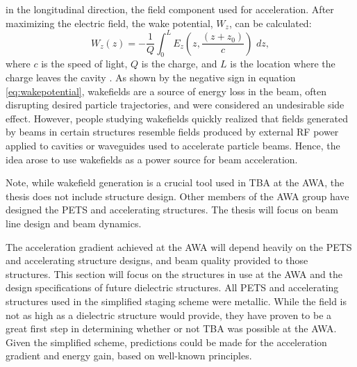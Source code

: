 in the longitudinal direction, the field component 
used for acceleration.   
After maximizing the electric field, the wake potential, $W_z$, can be calculated: 
\begin{equation}
W_z\left(z\right)= -\frac{1}{Q} \int_{0}^{L} E_z \left(z,\frac{\left(z+z_0\right)}{c}\right)\,\,dz,
\label{eq:wakepotential}
\end{equation} 
where $c$ is the speed of light, $Q$ is the charge, 
and $L$ is the location where the charge leaves the cavity \cite{SLACwakefields}.
As shown by the negative sign in equation \ref{eq:wakepotential}, wakefields are a source of 
energy loss in the beam, often disrupting desired particle trajectories, 
and were considered an undesirable side effect.
However, people studying wakefields quickly realized that fields
generated by beams in certain structures resemble fields produced by external RF power 
applied to cavities or waveguides used to accelerate particle beams.
Hence, the idea arose to use wakefields as a power source for beam acceleration. 

Note, while wakefield generation is a crucial tool used in TBA at the AWA, the thesis does not include 
structure design. Other members of the AWA group have designed the PETS and accelerating
structures. The thesis will focus on beam line design and beam dynamics. 



The acceleration gradient achieved at the AWA will depend heavily 
on the PETS and accelerating structure designs, and beam quality 
provided to those structures. This section will focus on the 
structures in use at the AWA and the design specifications of future 
dielectric structures. All PETS and accelerating structures 
used in the simplified staging scheme were metallic. 
While the field is not as high as a dielectric structure would provide,
they have proven to be a great first step 
in determining whether or not TBA was possible at the AWA. Given 
the simplified scheme, predictions could be made for the acceleration 
gradient and energy gain, based on well-known principles. 


